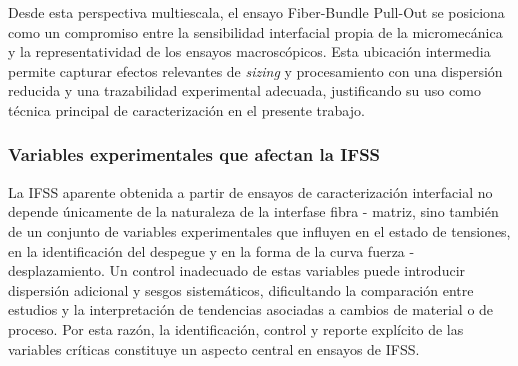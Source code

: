 \noindent
Desde esta perspectiva multiescala, el ensayo Fiber-Bundle Pull-Out se posiciona como un compromiso
entre la sensibilidad interfacial propia de la micromecánica y la representatividad de los ensayos
macroscópicos. Esta ubicación intermedia permite capturar efectos relevantes de \textit{sizing} y
procesamiento con una dispersión reducida y una trazabilidad experimental adecuada, justificando su
uso como técnica principal de caracterización en el presente trabajo.

\subsubsection{Variables experimentales que afectan la IFSS}

La IFSS aparente obtenida a partir de ensayos de caracterización interfacial no depende únicamente de
la naturaleza de la interfase fibra - matriz, sino también de un conjunto de variables experimentales
que influyen en el estado de tensiones, en la identificación del despegue y en la forma de la curva
fuerza - desplazamiento. Un control inadecuado de estas variables puede introducir dispersión adicional
y sesgos sistemáticos, dificultando la comparación entre estudios y la interpretación de tendencias
asociadas a cambios de material o de proceso. Por esta razón, la identificación, control y reporte
explícito de las variables críticas constituye un aspecto central en ensayos de IFSS.

